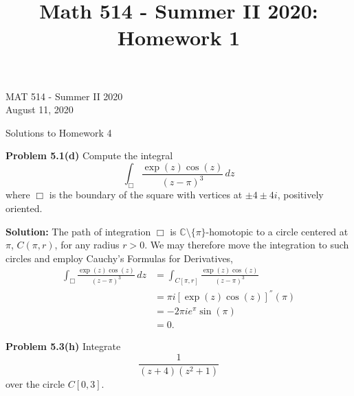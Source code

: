 \documentclass[12pt,oneside]{exam}
\title{Math 514 - Summer II 2020: Homework 1}
\newenvironment{exercise}[1]{\vspace{.1in}\noindent\textbf{Problem #1 \hspace{.05em}}}{}
\begin{document}
\begin{flushright}
\sc MAT 514 - Summer II 2020\\
August 11, 2020
\end{flushright}
\bigskip
 
\begin{center}
\textsf{Solutions to Homework 4} 
\end{center}


\begin{exercise}{5.1(d)}
Compute the integral
\begin{equation*}
\int_{\Box} \frac{\exp(z)\cos(z)}{(z-\pi)^3}\, dz
\end{equation*}
where $\Box$ is the boundary of the square with vertices at $\pm 4 \pm 4i$, positively oriented.
\end{exercise}

\vspace{0.5cm}

\noindent \textbf{Solution:} The path of integration $\Box$ is $\mathbb{C}\setminus \{\pi\}$-homotopic to a circle centered at $\pi$, $C(\pi, r)$, for any radius $r>0$. We may therefore move the integration to such circles and employ Cauchy's Formulas for Derivatives, 
\begin{align*}
\int_{\Box} \frac{\exp(z)\cos(z)}{(z-\pi)^3}\, dz & = \int_{C[\pi,r]} \frac{\exp(z)\cos(z)}{(z-\pi)^3} \\
& = \pi i [\exp(z)\cos(z)]^{''}(\pi) \\
& = -2\pi i e^{\pi}\sin(\pi) \\
& = 0.
\end{align*}

\vspace{1cm}

\begin{exercise}{5.3(h)}
Integrate 
\begin{equation*}
\frac{1}{(z+4)(z^2+1)}
\end{equation*}
over the circle $C[0,3]$. 
\end{exercise}
\end{document}
